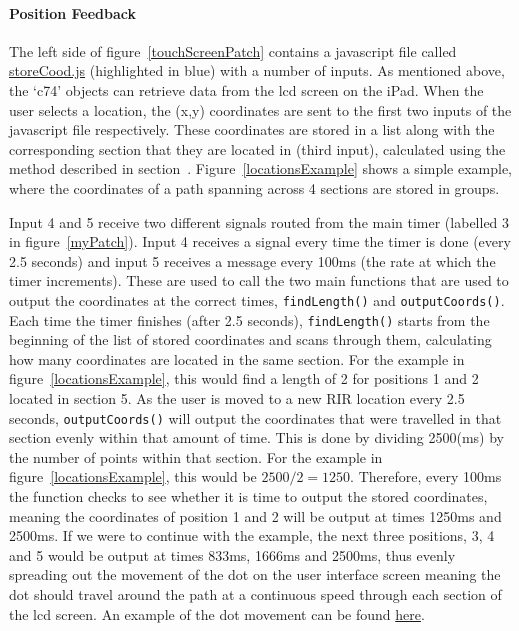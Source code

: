 \documentclass[../../main.tex]{subfiles}
\begin{document}
		\paragraph{Position Feedback}
			The left side of figure~\ref{touchScreenPatch} contains a javascript file called \href{http://lt669.github.io/code/javascript/html/storeCood.html}{storeCood.js} (highlighted in blue) with a number of inputs. As mentioned above, the `c74' objects can retrieve data from the lcd screen on the iPad. When the user selects a location, the (x,y) coordinates are sent to the first two inputs of the javascript file respectively. These coordinates are stored in a list along with the corresponding section that they are located in (third input), calculated using the method described in section~. Figure~\ref{locationsExample} shows a simple example, where the coordinates of a path spanning across 4 sections are stored in groups.

			Input 4 and 5 receive two different signals routed from the main timer (labelled 3 in figure~\ref{myPatch}). Input 4 receives a signal every time the timer is done (every 2.5 seconds) and input 5 receives a message every 100ms (the rate at which the timer increments). These are used to call the two main functions that are used to output the coordinates at the correct times, \texttt{findLength()} and \texttt{outputCoords()}. Each time the timer finishes (after 2.5 seconds), \texttt{findLength()} starts from the beginning of the list of stored coordinates and scans through them, calculating how many coordinates are located in the same section. For the example in figure~\ref{locationsExample}, this would find a length of 2 for positions 1 and 2 located in section 5. As the user is moved to a new \ac{RIR} location every 2.5 seconds, \texttt{outputCoords()} will output the coordinates that were travelled in that section evenly within that amount of time. This is done by dividing 2500(ms) by the number of points within that section. For the example in figure~\ref{locationsExample}, this would be $2500/2 = 1250$. Therefore, every 100ms the function checks to see whether it is time to output the stored coordinates, meaning the coordinates of position 1 and 2 will be output at times 1250ms and 2500ms. If we were to continue with the example, the next three positions, 3, 4 and 5 would be output at times 833ms, 1666ms and 2500ms, thus evenly spreading out the movement of the dot on the user interface screen meaning the dot should travel around the path at a continuous speed through each section of the lcd screen. An example of the dot movement can be found \href{http://lt669.github.io/pages/videos.html}{here}.
\end{document}
